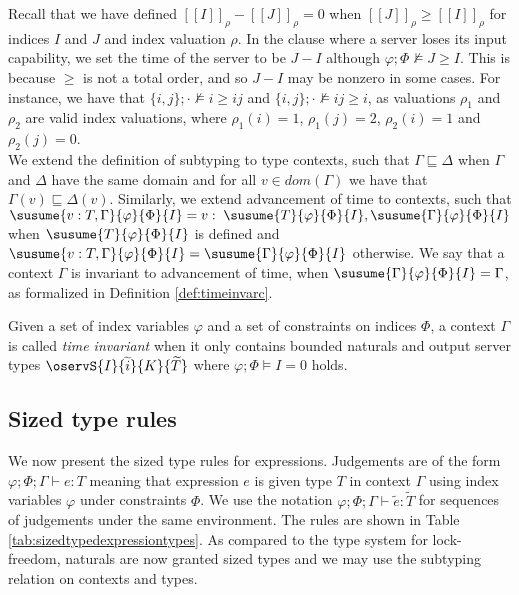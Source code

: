 Recall that we have defined $[\![I]\!]_\rho - [\![J]\!]_\rho = 0$ when $[\![J]\!]_\rho \geq [\![I]\!]_\rho$ for indices $I$ and $J$ and index valuation $\rho$. In the clause where a server loses its input capability, we set the time of the server to be $J - I$ although $\varphi;\Phi\not\vDash J \geq I$. This is because $\geq$ is not a total order, and so $J - I$ may be nonzero in some cases. For instance, we have that $\{i,j\};\cdot \not\vDash i \geq ij$ and $\{i,j\};\cdot\not\vDash ij \geq i$, as valuations $\rho_1$ and $\rho_2$ are valid index valuations, where $\rho_1(i) = 1$, $\rho_1(j)=2$, $\rho_2(i)=1$ and $\rho_2(j)=0$.\\

We extend the definition of subtyping to type contexts, such that $\Gamma \sqsubseteq \Delta$ when $\Gamma$ and $\Delta$ have the same domain and for all $v \in \textit{dom}(\Gamma)$ we have that $\Gamma(v) \sqsubseteq \Delta(v)$. Similarly, we extend advancement of time to contexts, such that $\susume{v : T, \Gamma}{\varphi}{\Phi}{I} = v :\; \susume{T}{\varphi}{\Phi}{I},\susume{\Gamma}{\varphi}{\Phi}{I}$ when $\susume{T}{\varphi}{\Phi}{I}$ is defined and $\susume{v : T, \Gamma}{\varphi}{\Phi}{I} = \susume{\Gamma}{\varphi}{\Phi}{I}$ otherwise. We say that a context $\Gamma$ is invariant to advancement of time, when $\susume{\Gamma}{\varphi}{\Phi}{I} = \Gamma$, as formalized in Definition \ref{def:timeinvarc}.
%
\begin{defi}
Given a set of index variables $\varphi$ and a set of constraints on indices $\Phi$, a context $\Gamma$ is called \textit{time invariant} when it only contains bounded naturals and output server types $\oservS{I}{\widetilde{i}}{K}{\widetilde{T}}$ where $\varphi;\Phi\vDash I = 0$ holds.
\label{def:timeinvarc}
\end{defi}
%
\subsection{Sized type rules}
We now present the sized type rules for expressions. Judgements are of the form $\varphi;\Phi;\Gamma\vdash e : T$ meaning that expression $e$ is given type $T$ in context $\Gamma$ using index variables $\varphi$ under constraints $\Phi$. We use the notation $\varphi;\Phi;\Gamma\vdash \widetilde{e} : \widetilde{T}$ for sequences of judgements under the same environment. The rules are shown in Table \ref{tab:sizedtypedexpressiontypes}. As compared to the type system for lock-freedom, naturals are now granted sized types and we may use the subtyping relation on contexts and types.\\

